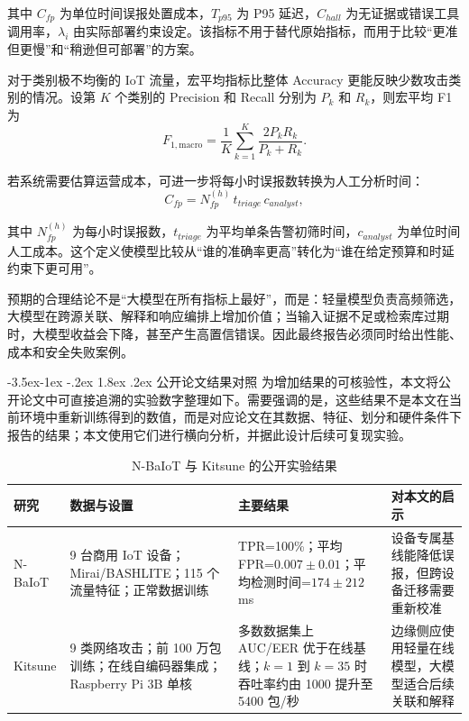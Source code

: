 \documentclass[twoside,withoutpreface,bwprint]{cumcmthesis}
\makeatletter
\renewcommand\subsection{\@startsection{subsection}{2}{\z@}%
    {-3.5ex\@plus -1ex \@minus -.2ex}%
    {1.8ex \@plus .2ex}%
    {\normalfont\heiti\zihao{-4}}}
\makeatother
\begin{document}
其中 $C_{fp}$ 为单位时间误报处置成本，$T_{p95}$ 为 P95 延迟，$C_{hall}$ 为无证据或错误工具调用率，$\lambda_i$ 由实际部署约束设定。该指标不用于替代原始指标，而用于比较“更准但更慢”和“稍逊但可部署”的方案。

对于类别极不均衡的 IoT 流量，宏平均指标比整体 Accuracy 更能反映少数攻击类别的情况。设第 $K$ 个类别的 Precision 和 Recall 分别为 $P_k$ 和 $R_k$，则宏平均 F1 为
\begin{equation}
F_{1,\mathrm{macro}}=\frac{1}{K}\sum_{k=1}^{K}\frac{2P_kR_k}{P_k+R_k}.
\end{equation}

若系统需要估算运营成本，可进一步将每小时误报数转换为人工分析时间：
\begin{equation}
C_{fp}=N_{fp}^{(h)}\,t_{triage}\,c_{analyst},
\end{equation}

其中 $N_{fp}^{(h)}$ 为每小时误报数，$t_{triage}$ 为平均单条告警初筛时间，$c_{analyst}$ 为单位时间人工成本。这个定义使模型比较从“谁的准确率更高”转化为“谁在给定预算和时延约束下更可用”。

预期的合理结论不是“大模型在所有指标上最好”，而是：轻量模型负责高频筛选，大模型在跨源关联、解释和响应编排上增加价值；当输入证据不足或检索库过期时，大模型收益会下降，甚至产生高置信错误。因此最终报告必须同时给出性能、成本和安全失败案例。

\subsection{公开论文结果对照}
为增加结果的可核验性，本文将公开论文中可直接追溯的实验数字整理如下。需要强调的是，这些结果不是本文在当前环境中重新训练得到的数值，而是对应论文在其数据、特征、划分和硬件条件下报告的结果；本文使用它们进行横向分析，并据此设计后续可复现实验。

\begin{table}[htbp]
\centering
\caption{N-BaIoT 与 Kitsune 的公开实验结果}
\label{tab:literature-anomaly}
\footnotesize
\begin{tabularx}{\textwidth}{p{2.6cm} X X X}
\toprule
研究 & 数据与设置 & 主要结果 & 对本文的启示 \\
\midrule
N-BaIoT & 9 台商用 IoT 设备；Mirai/BASHLITE；115 个流量特征；正常数据训练 & TPR=100\%；平均 FPR=$0.007\pm0.01$；平均检测时间=$174\pm212$ ms & 设备专属基线能降低误报，但跨设备迁移需要重新校准 \\
Kitsune & 9 类网络攻击；前 100 万包训练；在线自编码器集成；Raspberry Pi 3B 单核 & 多数数据集上 AUC/EER 优于在线基线；$k=1$ 到 $k=35$ 时吞吐率约由 1000 提升至 5400 包/秒 & 边缘侧应使用轻量在线模型，大模型适合后续关联和解释 \\
\bottomrule
\end{tabularx}
\end{table}
\end{document}
